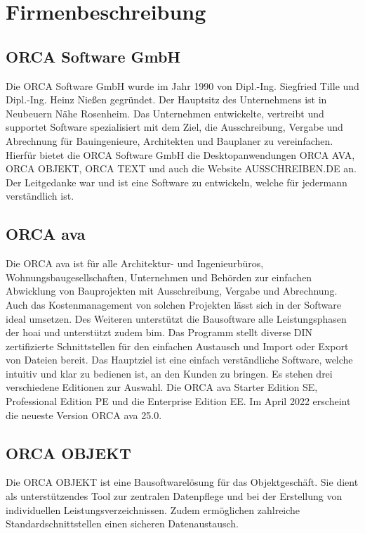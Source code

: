 \chapter{Firmenbeschreibung}
\section{ORCA Software GmbH}
Die ORCA Software GmbH wurde im Jahr 1990 von Dipl.-Ing. Siegfried Tille und Dipl.-Ing. Heinz Nießen gegründet. Der Hauptsitz des Unternehmens ist in Neubeuern Nähe Rosenheim. Das Unternehmen entwickelte, vertreibt und supportet Software spezialisiert mit dem Ziel, die Ausschreibung, Vergabe und Abrechnung für Bauingenieure, Architekten und Bauplaner zu vereinfachen. Hierfür bietet die ORCA Software GmbH die Desktopanwendungen ORCA AVA, ORCA OBJEKT, ORCA TEXT und auch die Website AUSSCHREIBEN.DE an. Der Leitgedanke war und ist eine Software zu entwickeln, welche für jedermann verständlich ist. \cite{Orca} 

\section{ORCA \ac{ava}}
Die ORCA \ac{ava} ist für alle Architektur- und Ingenieurbüros, Wohnungsbaugesellschaften, Unternehmen und Behörden zur einfachen Abwicklung von Bauprojekten mit Ausschreibung, Vergabe und Abrechnung. Auch das Kostenmanagement von solchen Projekten lässt sich in der Software ideal umsetzen. Des Weiteren unterstützt die Bausoftware alle Leistungsphasen der \ac{hoai} und unterstützt zudem \ac{bim}. Das Programm stellt diverse DIN zertifizierte Schnittstellen für den einfachen Austausch und Import oder Export von Dateien bereit. Das Hauptziel ist eine einfach verständliche Software, welche intuitiv und klar zu bedienen ist, an den Kunden zu bringen. Es stehen drei verschiedene Editionen zur Auswahl. Die ORCA \ac{ava} Starter Edition SE, Professional Edition PE und die Enterprise Edition EE. Im April 2022 erscheint die neueste Version ORCA \ac{ava} 25.0.

\section{ORCA OBJEKT}
Die ORCA OBJEKT ist eine Bausoftwarelösung für das Objektgeschäft. Sie dient als unterstützendes Tool zur zentralen Datenpflege und bei der Erstellung von individuellen Leistungsverzeichnissen. Zudem ermöglichen zahlreiche Standardschnittstellen einen sicheren Datenaustausch.


